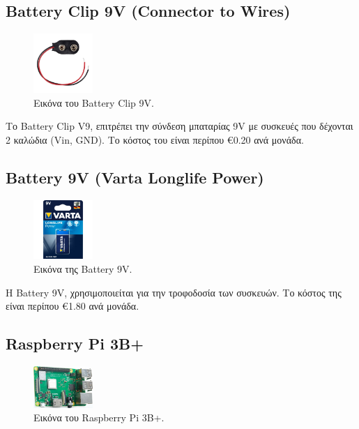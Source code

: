 \documentclass[conference]{IEEEtran}
\begin{document}
\subsection{Battery Clip 9V (Connector to Wires)}

\begin{figure}[H]
	\centerline{\includegraphics[width=0.2\textwidth]{assets/battery-clip}}
	\caption{Εικόνα του Battery Clip 9V.}
	\label{Εικόνα του Battery Clip 9V.}
\end{figure}

Το Battery Clip V9, επιτρέπει την σύνδεση μπαταρίας 9V με συσκευές που δέχονται 2 καλώδια (Vin, GND). Το κόστος του είναι περίπου €0.20 ανά μονάδα. \cite{bcv9}

\subsection{Battery 9V (Varta Longlife Power)}

\begin{figure}[H]
	\centerline{\includegraphics[width=0.2\textwidth]{assets/battery}}
	\caption{Εικόνα της Battery 9V.}
	\label{Εικόνα της Battery 9V.}
\end{figure}

Η Battery 9V, χρησιμοποιείται για την τροφοδοσία των συσκευών. Το κόστος της είναι περίπου €1.80 ανά μονάδα. \cite{bv9}

\subsection{Raspberry Pi 3B+}

\begin{figure}[H]
	\centerline{\includegraphics[width=0.2\textwidth]{assets/rpi3}}
	\caption{Εικόνα του Raspberry Pi 3B+.}
	\label{Εικόνα του Raspberry Pi 3B+}
\end{figure}
\end{document}
